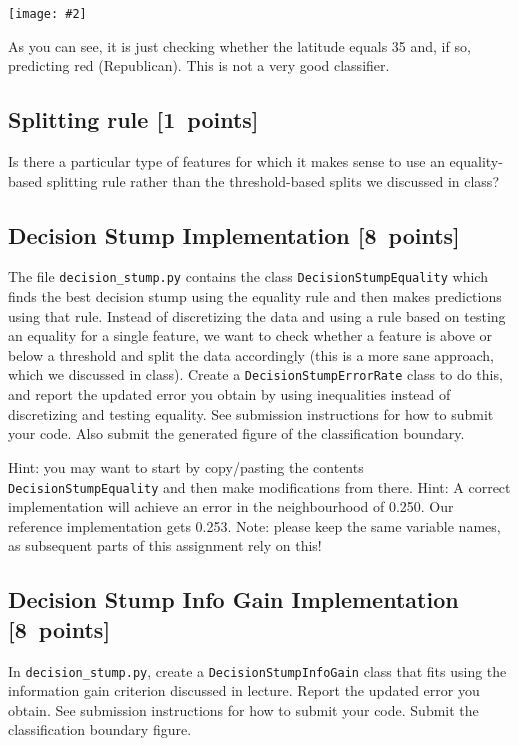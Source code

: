 \documentclass{article}
\newcommand{\blu}[1]{{\textcolor{blu}{#1}}}
\let\ask\blu
\newcommand\pts[1]{\textcolor{pointscolour}{[#1~points]}}
\newcommand{\centerfig}[2]{\begin{center}\texttt{[image: \#2]}\end{center}}
\begin{document}
  \centerfig{0.7}{./figs/q6_decisionBoundary}

  As you can see, it is just checking whether the latitude equals 35 and, if so, predicting red (Republican).
  This is not a very good classifier.

  \subsection{Splitting rule \pts{1}}

  Is there a particular type of features for which it makes sense to use an equality-based splitting rule rather than the threshold-based splits we discussed in class?


  \subsection{Decision Stump Implementation \pts{8}}

  The file \texttt{decision\string_stump.py} contains the class \texttt{DecisionStumpEquality} which
  finds the best decision stump using the equality rule and then makes predictions using that
  rule. Instead of discretizing the data and using a rule based on testing an equality for
  a single feature, we want to check whether a feature is above or below a threshold and
  split the data accordingly (this is a more sane approach, which we discussed in class).
  \ask{Create a \texttt{DecisionStumpErrorRate} class to do this, and report the updated error you
  obtain by using inequalities instead of discretizing and testing equality.
  See submission instructions for how to submit your code.
  Also submit the generated figure of the classification boundary.}

  Hint: you may want to start by copy/pasting the contents \texttt{DecisionStumpEquality} and then make modifications from there.
  Hint: A correct implementation will achieve an error in the neighbourhood of 0.250. Our reference implementation gets 0.253.
  Note: please keep the same variable names, as subsequent parts of this assignment rely on this!



  \subsection{Decision Stump Info Gain Implementation \pts{8}}

  In \texttt{decision\string_stump.py}, \ask{create a \texttt{DecisionStumpInfoGain} class that
  fits using the information gain criterion discussed in lecture.
  Report the updated error you obtain.
  See submission instructions for how to submit your code.
  Submit the classification boundary figure.}
\end{document}
